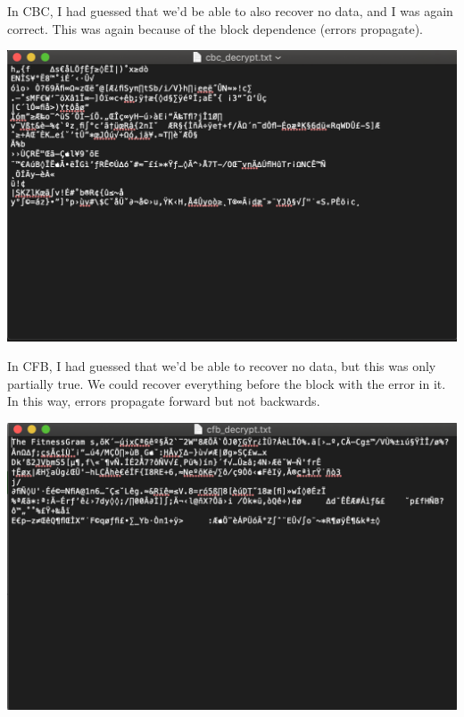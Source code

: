 \documentclass{article}
\begin{document}
In CBC, I had guessed that we'd be able to also recover no data, and I was again correct.  This was again because of the block dependence (errors propagate).\\
\begin{center}
    \includegraphics[scale=0.5]{cbc_decrypt.png}
\end{center}

In CFB, I had guessed that we'd be able to recover no data, but this was only partially true.  We could recover everything before the block with the error in it.  In this way, errors propagate forward but not backwards.\\
\begin{center}
    \includegraphics[scale=0.5]{cfb_decrypt.png}
\end{center}
\end{document}
